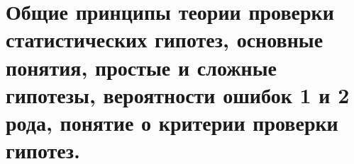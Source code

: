 \documentclass[polytech/stats/exam-2023/stats-exam-2023.tex]{subfiles}
\begin{document}
\section{Общие принципы теории проверки статистических гипотез, основные понятия, простые и сложные гипотезы, вероятности ошибок 1 и 2 рода, понятие о критерии проверки гипотез.}
\end{document}
